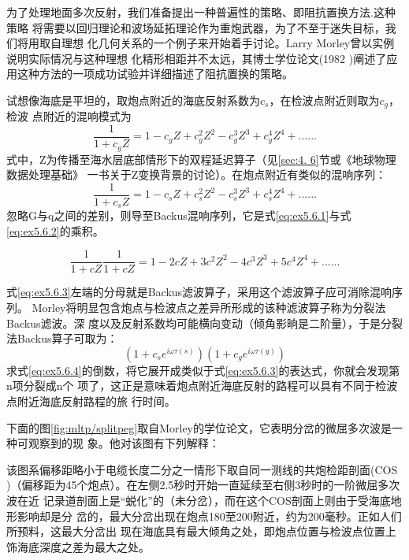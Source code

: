 为了处理地面多次反射，我们准备提出一种普遍性的策略、即阻抗置换方法.这种策略
将需要以回归理论和波场延拓理论作为重炮武器，为了不至于迷失目标，我们将用取自理想
化几何关系的一个例子来开始着手讨论。Larry
Morley曾以实例说明实际情况与这种理想
化精形相距并不太远，其博士学位论文(1982
)阐述了应用这种方法的一项成功试验并详细描述了阻抗置换的策略。

试想像海底是平坦的，取炮点附近的海底反射系数为$c_s$，在检波点附近则取为$c_g$，检波
点附近的混响模式为
\begin{equation}
\frac{1}{1+c_gZ}=1-c_gZ+c_g^2Z^2-c_g^3Z^3+c_g^4Z^4+......
\label{eq:ex5.6.1}
\end{equation}
式中，Z为传播至海水层底部情形下的双程延迟算子（见\ref{sec:4.
6}节或《地球物理数据处理基础》
一书关于Z变换背景的讨论）。在炮点附近有类似的混响序列：
\begin{equation}
\frac{1}{1+c_sZ}=1-c_sZ+c_s^2Z^2-c_s^3Z^3+c_s^4Z^4+......
\label{eq:ex5.6.2}
\end{equation}
忽略G与q之间的差别，则导至Backus混响序列，它是式\ref{eq:ex5.6.1}与式\ref{eq:ex5.6.2}的乘积。

\begin{equation}
\frac{1}{1+cZ}\frac{1}{1+cZ}=
1-2cZ+3c^2Z^2-4c^3Z^3+5c^4Z^4+......
\label{eq:ex5.6.3}
\end{equation}

式\ref{eq:ex5.6.3}左端的分母就是Backus滤波算子，采用这个滤波算子应可消除混响序列。
Morley将明显包含炮点与检波点之差异所形成的该种滤波算子称为分裂法Backus滤波。深
度以及反射系数均可能横向变动（倾角影晌是二阶量），于是分裂法Backus算子可取为：
\begin{equation}
(1+c_se^{i\omega\tau(s)})(1+c_ge^{i\omega\tau(g)})
\label{eq:ex5.6.4}
\end{equation}
求式\ref{eq:ex5.6.4}的倒数，将它展开成类似于式\ref{eq:ex5.6.3}的表达式，你就会发现第n项分裂成n个
项了，这正是意味着炮点附近海底反射的路程可以具有不同于检波点附近海底反射路程的旅
行时间。


下面的图\ref{fig:mltp/splitpeg}取自Morley的学位论文，它表明分岔的微屈多次波是一种可观察到的现
象。他对该图有下列解释：

该图系偏移距略小于电缆长度二分之一情形下取自同一测线的共炮检距剖面(COS
)（偏移距为45个炮点）。在左侧2.5秒时开始一直延续至右侧3秒时的一阶微屈多次波在近
记录道剖面上是“蜕化”的（未分岔），而在这个COS剖面上则由于受海底地形影响却是分
岔的，最大分岔出现在炮点180至200附近，约为200毫秒。正如人们所预料，这最大分岔出
现在海底具有最大倾角之处，即炮点位置与检波点位置上饰海底深度之差为最大之处。

